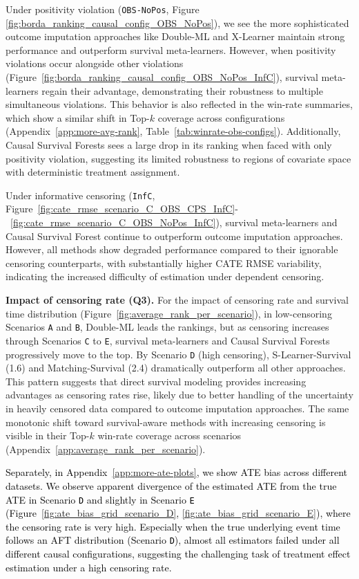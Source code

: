 \documentclass{article} %
\begin{document}
Under positivity violation (\texttt{OBS-NoPos}, Figure \ref{fig:borda_ranking_causal_config_OBS_NoPos}), we see the more sophisticated outcome imputation approaches like Double-ML and X-Learner maintain strong performance and outperform survival meta-learners. However, when positivity violations occur alongside other violations (Figure~\ref{fig:borda_ranking_causal_config_OBS_NoPos_InfC}), survival meta-learners regain their advantage, demonstrating their robustness to multiple simultaneous violations.
This behavior is also reflected in the win-rate summaries, which show a similar shift in Top-$k$ coverage across configurations (Appendix~\ref{app:more-avg-rank}, Table~\ref{tab:winrate-obs-configs}).
Additionally, Causal Survival Forests sees a large drop in its ranking when faced with only positivity violation, suggesting its limited robustness to regions of covariate space with deterministic treatment assignment.

Under informative censoring (\texttt{InfC}, Figure~\ref{fig:cate_rmse_scenario_C_OBS_CPS_InfC}-~\ref{fig:cate_rmse_scenario_C_OBS_NoPos_InfC}), survival meta-learners and Causal Survival Forest continue to outperform outcome imputation approaches.
However, all methods show degraded performance compared to their ignorable censoring counterparts, with substantially higher CATE RMSE variability, indicating the increased difficulty of estimation under dependent censoring.

\textbf{Impact of censoring rate (Q3).}
For the impact of censoring rate and survival time distribution (Figure~\ref{fig:average_rank_per_scenario}), in low-censoring Scenarios \texttt{A} and \texttt{B}, Double-ML leads the rankings, but as censoring increases through Scenarios \texttt{C} to \texttt{E}, survival meta-learners and Causal Survival Forests progressively move to the top. By Scenario \texttt{D} (high censoring), S-Learner-Survival (1.6) and Matching-Survival (2.4) dramatically outperform all other approaches. This pattern suggests that direct survival modeling provides increasing advantages as censoring rates rise, likely due to better handling of the uncertainty in heavily censored data compared to outcome imputation approaches.
The same monotonic shift toward survival-aware methods with increasing censoring is visible in their Top-$k$ win-rate coverage across scenarios (Appendix~\ref{app:average_rank_per_scenario}).

\textcolor{black}{
Separately, in Appendix~\ref{app:more-ate-plots}, we show ATE bias across different datasets.
We observe apparent divergence of the estimated ATE from the true ATE in Scenario \texttt{D} and slightly in Scenario \texttt{E} (Figure~\ref{fig:ate_bias_grid_scenario_D}, \ref{fig:ate_bias_grid_scenario_E}), where the censoring rate is very high. Especially when the true underlying event time follows an AFT distribution (Scenario \texttt{D}), almost all estimators failed under all different causal configurations, suggesting the challenging task of treatment effect estimation under a high censoring rate.
}
\end{document}
